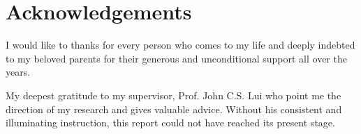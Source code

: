 \chapter*{Acknowledgements}
I would like to thanks for every person who comes to my life and deeply indebted to my beloved parents for their generous and unconditional support all over the years.

My deepest gratitude to my supervisor, Prof. John C.S. Lui who point me the direction of my research and gives valuable advice. Without his consistent and illuminating instruction, this report could not have reached its present stage.
